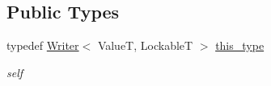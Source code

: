 \subsection*{Public Types}
\begin{DoxyCompactItemize}
\item 
\hypertarget{classhryky_1_1atomic_1_1_writer_a6b1cad65fb3ef1a993a5eb9e91450aea}{typedef \hyperlink{classhryky_1_1atomic_1_1_writer}{Writer}$<$ Value\-T, Lockable\-T $>$ \hyperlink{classhryky_1_1atomic_1_1_writer_a6b1cad65fb3ef1a993a5eb9e91450aea}{this\-\_\-type}}\label{classhryky_1_1atomic_1_1_writer_a6b1cad65fb3ef1a993a5eb9e91450aea}

\begin{DoxyCompactList}\small\item\em self \end{DoxyCompactList}\end{DoxyCompactItemize}
